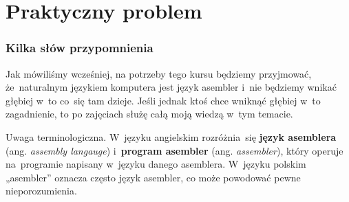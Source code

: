 \documentclass[10pt,t]{beamer}
\begin{document}




















\section{Praktyczny problem}



\begin{frame}
  \frametitle{Kilka słów przypomnienia}


  Jak mówiliśmy wcześniej, na potrzeby tego kursu będziemy przyjmować,
  że~naturalnym językiem komputera jest język asembler i~nie będziemy
  wnikać głębiej w~to co~się tam dzieje. Jeśli jednak ktoś chce wniknąć
  głębiej w~to zagadnienie, to po zajęciach służę całą moją wiedzą w~tym
  temacie.

  \alert{Uwaga terminologiczna.} W~języku angielskim rozróżnia~się
  \textbf{język asemblera} (ang. \textit{assembly langauge})
  i~\textbf{program asembler} (ang. \textit{assembler}), który operuje
  na~programie napisany w~języku danego asemblera. W~języku polskim
  „asembler” oznacza często język asembler, co może powodować pewne
  nieporozumienia.

\end{frame}
\end{document}
